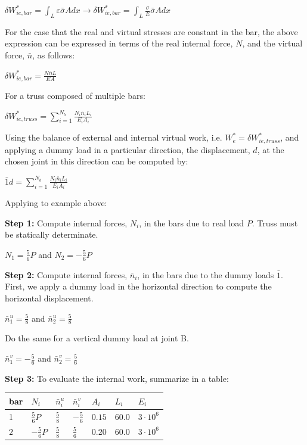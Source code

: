 \documentclass{article}
\begin{document}
\begin{multicols*}{2}
    $\delta W_{ie,bar}^*=\int_L \varepsilon \bar{\sigma} A dx\rightarrow 
    \delta W_{ie,bar}^*=\int_L \frac{\sigma}{E} \bar{\sigma} A dx$\par 
    For the case that the real and virtual stresses are constant in the bar, the 
    above expression can be expressed in terms of the real internal force, $N$, 
    and the virtual force, $\bar{n}$, as follows:\par 
    $\delta W_{ie,bar}^*=\frac{N\bar{n}L}{EA}$\par 
    For a truss composed of multiple bars:\par 
    $\delta W_{ie,truss}^* = \sum\limits_{i=1}^{N_b} \frac{N_i \bar{n}_i L_i}{E_i A_i}$\par 
    Using the balance of external and internal virtual work, i.e. $W_e^*=\delta 
    W_{ie,truss}^*$, and applying a dummy load in a particular direction, the 
    displacement, $d$, at the chosen joint in this direction can be computed by:\par 
    $\bar{1}d=\sum\limits_{i=1}^{N_b} \frac{N_i \bar{n}_i L_i}{E_i A_i}$\par
    Applying to example above:\par 
    \textbf{Step 1:} Compute internal forces, $N_i$, in the bars due to real load $P$. 
    Truss must be statically determinate.\par 
    $N_1=\frac{5}{6}P$ and $N_2=-\frac{5}{6}P$ \par 
    \textbf{Step 2:} Compute internal forces, $\bar{n}_i$, in the bars due to the 
    dummy loads $\bar{1}$. First, we apply a dummy load in the horizontal direction
    to compute the horizontal displacement.\par 
    $\bar{n}_1^u = \frac{5}{8}$ and $\bar{n}_2^u=\frac{5}{8}$ \par 
    Do the same for a vertical dummy load at joint B. \par 
    $\bar{n}_1^v = -\frac{5}{6}$ and $\bar{n}_2^v=\frac{5}{6}$\par 
    \textbf{Step 3:} To evaluate the internal work, summarize in a table: 
     
    \begin{center}
        \begin{tabular}{l|llllll}
            bar & $N_i$ & $\bar{n}_i^u$ & $\bar{n}_i^v$ & $A_i$ & $L_i$ & $E_i$ \\
            \hline
            1 & $\frac{5}{6}P$ & $\frac{5}{8}$ & $-\frac{5}{6}$ & $0.15$ & $60.0$ & $3\cdot 10^6$ \\
            $2$ & $-\frac{5}{6}P$ & $\frac{5}{8}$ & $\frac{5}{6}$ & $0.20$ & $60.0$ & $3\cdot 10^6$ \\
        \end{tabular}
    \end{center}


\end{multicols*}
\end{document}
